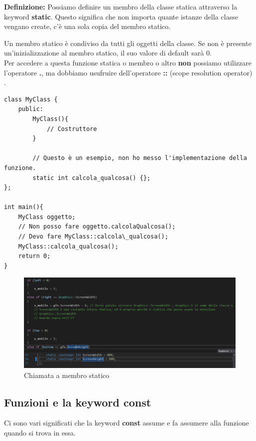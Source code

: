 \textsf{\small \textbf{Definizione: } Possiamo definire un membro della classe statica attraverso la keyword \textbf{static}. Questo significa che non importa quante istanze della classe vengano create, c'è una sola copia del membro statico.}

\textsf{\small Un membro statico è condiviso da tutti gli oggetti della classe. Se non è presente un'inizializzazione al membro statico, il suo valore di default sarà 0.} \\ 

\textsf{\small Per accedere a questa funzione statica o membro o altro \textbf{non} possiamo utilizzare l'operatore \textbf{.}, ma dobbiamo usufruire dell'operatore \textbf{::} (scope resolution operator) .} \\

\begin{lstlisting}
class MyClass {
	public:
		MyClass(){
			// Costruttore
		}	
	
		// Questo è un esempio, non ho messo l'implementazione della funzione.
		static int calcola_qualcosa() {};
};

int main(){
	MyClass oggetto;
	// Non posso fare oggetto.calcolaQualcosa();
	// Devo fare MyClass::calcola\_qualcosa();
	MyClass::calcola_qualcosa();
	return 0;
}
\end{lstlisting}

\begin{figure}[H]
	\centering
	\includegraphics[width=1\textwidth, height=1\textheight, keepaspectratio]{./imgs/Class__static_type2.png}
	\caption{Chiamata a membro statico}
	\label{fig:class_static_type}
\end{figure}

\subsection{Funzioni e la keyword const}

\textsf{\small Ci sono vari significati che la keyword \textbf{const} assume e fa assumere alla funzione quando si trova in essa.} \\

